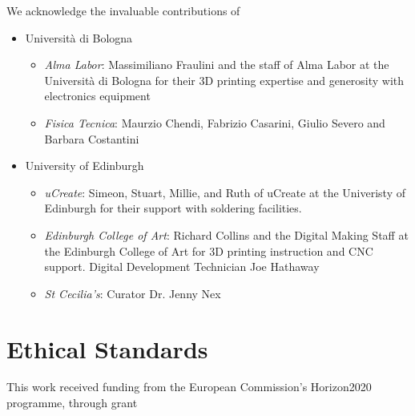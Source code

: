 \documentclass[sigconf]{nimeart}
\begin{document}
\maketitle




\begin{acks}
 We acknowledge the invaluable contributions of
\begin{itemize}
\item
  Università di Bologna
  \begin{itemize}
  \item
    \emph{Alma Labor}:
      Massimiliano Fraulini and the staff of Alma Labor at the Università
      di Bologna for their 3D printing expertise and generosity with
      electronics equipment
  \item
    \emph{Fisica Tecnica}: Maurzio Chendi, Fabrizio Casarini, Giulio Severo and Barbara
      Costantini    
  \end{itemize}
\item
  University of Edinburgh
  \begin{itemize}
  \item
    \emph{uCreate}:    
      Simeon, Stuart, Millie, and Ruth of uCreate at the Univeristy of
      Edinburgh for their support with soldering facilities.    
  \item
    \emph{Edinburgh College of Art}: Richard Collins and the Digital Making Staff at the Edinburgh
      College of Art for 3D printing instruction and CNC support. Digital Development Technician Joe Hathaway    
    \item  
      \emph{St Cecilia's}: Curator Dr. Jenny Nex
  \end{itemize}
\end{itemize}

\end{acks}


\section{Ethical Standards}
This work received funding from the European Commission's Horizon2020 programme, through grant 



\end{document}
